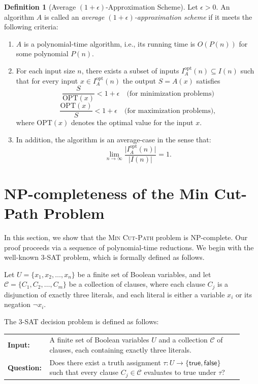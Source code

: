 \documentclass[journal ]{new-aiaa}
\numberwithin{equation}{section}
\theoremstyle{definition}
\newtheorem{definition}{Definition}[section]
\theoremstyle{plain}
\theoremstyle{remark}
\begin{document}
\begin{definition}
[Average $(1+\epsilon)$-Approximation Scheme]
Let $\epsilon > 0$. An algorithm $A$ is called an \emph{average $(1+\epsilon)$-approximation scheme} if it meets the following criteria:
\begin{enumerate}
    \item $A$ is a polynomial-time algorithm, i.e., its running time is $O(P(n))$ for some polynomial $P(n)$.
    \item For each input size $n$, there exists a subset of inputs $I_{A}^{\mathrm{opt}}(n) \subseteq I(n)$ such that for every input $x \in I_{A}^{\mathrm{opt}}(n)$ the output $S = A(x)$ satisfies
    \[
    \frac{S}{\mathrm{OPT}(x)} < 1+\epsilon \quad \text{(for minimization problems)}
    \]
    \[
    \frac{\mathrm{OPT}(x)}{S} < 1+\epsilon \quad \text{(for maximization problems)},
    \]
    where $\mathrm{OPT}(x)$ denotes the optimal value for the input $x$.
    \item In addition, the algorithm is an average-case in the sense that:
    \[
    \lim_{n \to \infty} \frac{\lvert I_{A}^{\mathrm{opt}}(n) \rvert}{\lvert I(n) \rvert} = 1.
    \]
\end{enumerate}
\end{definition}





\section{NP-completeness of the Min Cut-Path Problem}
\label{sec:NP-completeness }
In this section, we show that the \textsc{Min Cut-Path} problem is NP-complete. 
Our proof proceeds via a sequence of polynomial-time reductions. 
We begin with the well-known \textsc{3-SAT} problem, which is formally defined as follows.





\begin{problem}
Let $U = \{x_1, x_2, \dots, x_n\}$ be a finite set of Boolean variables, and let 
$\mathcal{C} = \{C_1, C_2, \dots, C_m\}$ be a collection of clauses, where each clause 
$C_j$ is a disjunction of exactly three literals, and each literal is either a variable $x_i$ or its negation $\neg x_i$.  

The \textsc{3-SAT} decision problem is defined as follows:

\begin{center}
\begin{tabular}{p{0.12\linewidth}p{0.8\linewidth}}
\textbf{Input:} & A finite set of Boolean variables $U$ and a collection $\mathcal{C}$ of clauses, each containing exactly three literals.\\
\textbf{Question:} & Does there exist a truth assignment $\tau: U \rightarrow \{\mathsf{true}, \mathsf{false}\}$ such that every clause $C_j \in \mathcal{C}$ evaluates to \textsf{true} under $\tau$?
\end{tabular}
\end{center}
\end{problem}
\end{document}
